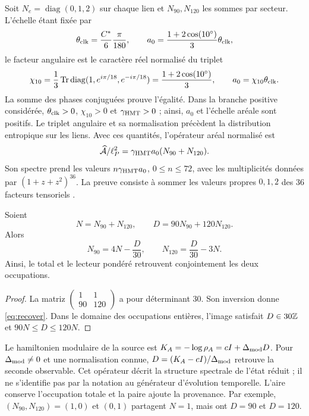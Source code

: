 Soit $N_e=\operatorname{diag}(0,1,2)$ sur chaque lien et
$N_{90},N_{120}$ les sommes par secteur. L'échelle étant fixée par
\[
\theta_{\rm clk}=\frac{C^*}{6}\frac{\pi}{180},\qquad
a_0=\frac{1+2\cos(10^\circ)}3\theta_{\rm clk},
\]
le facteur angulaire est le caractère réel normalisé du triplet
\begin{equation}
 \chi_{10}=\frac13\operatorname{Tr}\operatorname{diag}
       (1,e^{i\pi/18},e^{-i\pi/18})
 =\frac{1+2\cos(10^\circ)}3,
 \qquad a_0=\chi_{10}\theta_{\rm clk}.
 \label{eq:ii-area-caracter-triplete}
\end{equation}
La somme des phases conjuguées prouve l'égalité. Dans la branche positive
considérée, \(\theta_{\rm clk}>0\), \(\chi_{10}>0\) et
\(\gamma_{\mathrm{HMT}}>0\) ; ainsi, \(a_0\) et l'échelle aréale sont
positifs. Le triplet angulaire et sa normalisation précèdent la
distribution entropique sur les liens. Avec ces quantités,
l'opérateur aréal normalisé est
\[
\widehat{\mathcal A}/\ell_P^2
=\gamma_{\mathrm{HMT}}a_0(N_{90}+N_{120}).
\]
Son spectre prend les valeurs $n\gamma_{\mathrm{HMT}}a_0$, $0\le n\le72$,
avec les multiplicités données par $(1+z+z^2)^{36}$.
La preuve consiste à sommer les valeurs propres $0,1,2$ des
36 facteurs tensoriels \cite{area}.

\begin{theorem}
Soient
\[
N=N_{90}+N_{120},\qquad D=90N_{90}+120N_{120}.
\]
Alors
\begin{equation}
N_{90}=4N-\frac D{30},\qquad
N_{120}=\frac D{30}-3N.
\label{eq:recover}
\end{equation}
Ainsi, le total et le lecteur pondéré retrouvent conjointement
les deux occupations.
\end{theorem}
\begin{proof}
La matriz $\left(\begin{smallmatrix}1&1\\90&120\end{smallmatrix}\right)$
a pour déterminant $30$. Son inversion donne \eqref{eq:recover}.
Dans le domaine des occupations entières, l'image satisfait
$D\in30\mathbb Z$ et $90N\le D\le120N$.
\end{proof}

Le hamiltonien modulaire de la source est
$K_A=-\log\rho_A=cI+\Delta_{\rm mod}D$.
Pour $\Delta_{\rm mod}\ne0$ et une normalisation connue,
$D=(K_A-cI)/\Delta_{\rm mod}$ retrouve la seconde observable.
Cet opérateur décrit la structure spectrale de l’état réduit ;
il ne s’identifie pas par la notation au générateur d’évolution temporelle.
L’aire conserve l’occupation totale et la paire ajoute la provenance.
Par exemple, $(N_{90},N_{120})=(1,0)$ et $(0,1)$ partagent $N=1$,
mais ont $D=90$ et $D=120$.

